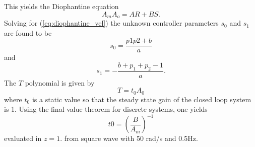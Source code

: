 \documentclass[12pt,a4paper]{article}
\begin{document}
This yields the Diophantine equation
\begin{equation}
    \label{eq:diophantine_vel}
    A_mA_o = AR + BS.
\end{equation}
Solving for (\ref{eq:diophantine_vel}) the unknown controller parameters $s_0$
and $s_1$ are found to be
\begin{equation}
    \label{eq:s0_vel}
    s_0 = \frac{p1p2+b}{a}
\end{equation}
and
\begin{equation}
    \label{eq:s1_vel}
    s_1 = -\frac{b + p_1 + p_2 -1}{a}.
\end{equation}
The $T$ polynomial is given by 
\begin{equation}
    \label{eq:T_vel}
    T = t_0A_0
\end{equation}
where $t_0$ is a static value so that the steady state gain of the closed loop
system is 1. Using the final-value theorem for discrete systems, one yields
\begin{equation}
    \label{eq:t0_vel}
    t0 = \left (\frac{B}{A_m} \right )^{-1}
\end{equation}
evaluated in $z=1$. 
from square wave with 50 rad/s and 0.5Hz.
\end{document}

